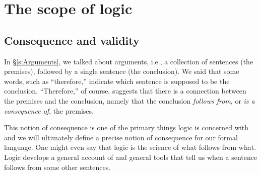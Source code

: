 \begin{practiceproblems}
\begin{enumerate}
\end{enumerate}

\end{practiceproblems}

\chapter{The scope of logic}
\label{s:Valid}




\section{Consequence and validity}

In \S\ref{s:Arguments}, we talked about arguments, i.e., a collection of sentences (the premises), followed by a single sentence (the conclusion). We said that some words, such as ``therefore,'' indicate which sentence is supposed to be the conclusion. ``Therefore,'' of course, suggests that there is a connection between the premises and the conclusion, namely that the conclusion \emph{follows from}, or \emph{is a consequence of}, the premises.

This notion of consequence is one of the primary things logic is concerned with and we will ultimately define a precise notion of consequence for our formal language. One might even say that logic is the science of what follows from what.  Logic develops a general account of and general tools that tell us when a sentence follows from some other sentences.

